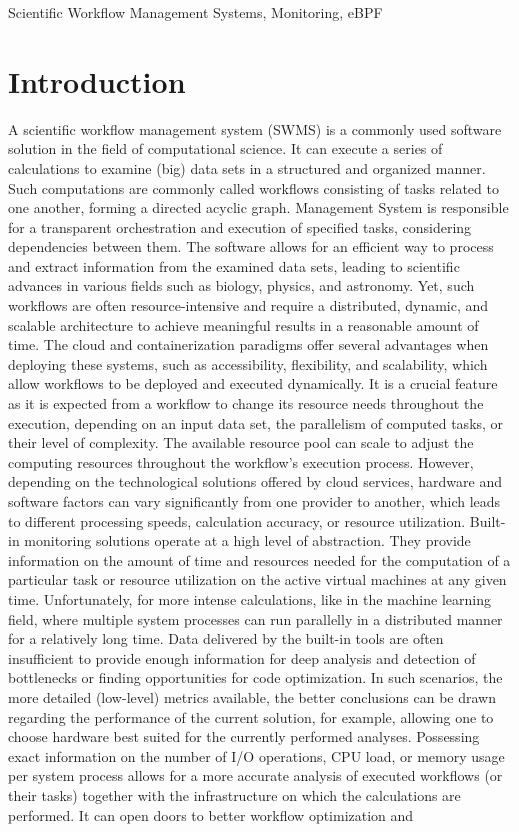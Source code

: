 \documentclass[lettersize,journal]{IEEEtran}
\begin{document}
\begin{IEEEkeywords}
	Scientific Workflow Management Systems, Monitoring, eBPF
\end{IEEEkeywords}

\section{Introduction}
A scientific workflow management system (SWMS) is a commonly used software solution in the field of computational science. It can execute a series of calculations to examine (big) data sets in a structured and organized manner. Such computations are commonly called workflows consisting of tasks related to one another, forming a directed acyclic graph. Management System is responsible for a transparent orchestration and execution of specified tasks, considering dependencies between them. The software allows for an efficient way to process and extract information from the examined data sets, leading to scientific advances in various fields such as biology, physics, and astronomy\cite{challengesSW}. Yet, such workflows are often resource-intensive and require a distributed, dynamic, and scalable architecture to achieve meaningful results in a reasonable amount of time. The cloud and containerization paradigms offer several advantages when deploying these systems, such as accessibility, flexibility, and scalability, which allow workflows to be deployed and executed dynamically. It is a crucial feature as it is expected from a workflow to change its resource needs throughout the execution, depending on an input data set, the parallelism of computed tasks, or their level of complexity. The available resource pool can scale to adjust the computing resources throughout the workflow's execution process. However, depending on the technological solutions offered by cloud services, hardware and software factors can vary significantly from one provider to another, which leads to different processing speeds, calculation accuracy, or resource utilization\cite{compareCloud}. Built-in monitoring solutions operate at a high level of abstraction. They provide information on the amount of time and resources needed for the computation of a particular task or resource utilization on the active virtual machines at any given time. Unfortunately, for more intense calculations, like in the machine learning field, where multiple system processes can run parallelly in a distributed manner for a relatively long time. Data delivered by the built-in tools are often insufficient to provide enough information for deep analysis and detection of bottlenecks or finding opportunities for code optimization. In such scenarios, the more detailed (low-level) metrics available, the better conclusions can be drawn regarding the performance of the current solution, for example, allowing one to choose hardware best suited for the currently performed analyses. Possessing exact information on the number of I/O operations, CPU load, or memory usage per system process allows for a more accurate analysis of executed workflows (or their tasks) together with the infrastructure on which the calculations are performed. It can open doors to better workflow optimization and 
\end{document}
